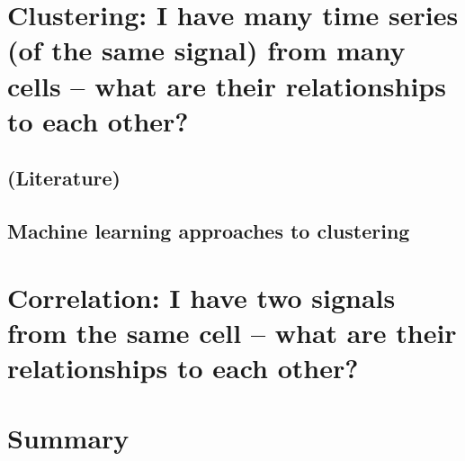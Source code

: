 \section{Clustering: I have many time series (of the same signal) from many cells -- what are their relationships to each other?}

\subsection{(Literature)}

\subsection{Machine learning approaches to clustering}

\section{Correlation: I have two signals from the same cell -- what are their relationships to each other?}

\section{Summary}
